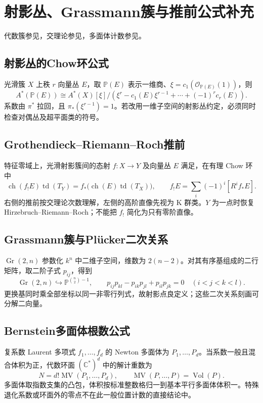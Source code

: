 \documentclass[../main.tex]{subfiles}
\begin{document}
\section{射影丛、Grassmann簇与推前公式补充}
代数簇参见\cite{milneAG}，交理论参见\cite{stacks}，多面体计数参见\cite{toric}。
\subsection{射影丛的Chow环公式}
光滑簇 $X$ 上秩 $r$ 向量丛 $E$，取 $\mathbb P(E)$ 表示一维商、$\xi=c_1(\mathcal O_{\mathbb P(E)}(1))$，则
\[
A^*(\mathbb P(E))\cong
A^*(X)[\xi]/\left(\xi^r-c_1(E)\xi^{r-1}+\cdots+(-1)^rc_r(E)\right).
\]
系数由 $\pi^*$ 拉回，且 $\pi_*(\xi^{r-1})=1$。若改用一维子空间的射影丛约定，必须同时检查对偶丛及超平面类的符号。
\subsection{Grothendieck--Riemann--Roch推前}
特征零域上，光滑射影簇间的态射 $f:X\to Y$ 及向量丛 $E$ 满足，在有理 Chow 环中
\[
\operatorname{ch}(f_!E)\operatorname{td}(T_Y)
=f_*\bigl(\operatorname{ch}(E)\operatorname{td}(T_X)\bigr),\qquad
f_!E=\sum_i(-1)^i[R^if_*E].
\]
右侧的推前按交理论次数理解，左侧的高阶直像先视为 K 群类。$Y$ 为一点时恢复 Hirzebruch--Riemann--Roch；不能把 $f_!$ 简化为只有零阶直像。
\subsection{Grassmann簇与Plücker二次关系}
$\operatorname{Gr}(2,n)$ 参数化 $k^n$ 中二维子空间，维数为 $2(n-2)$。对其有序基组成的二行矩阵，取二阶子式 $p_{ij}$，得到
\[
\operatorname{Gr}(2,n)\hookrightarrow\mathbb P^{\binom n2-1},\qquad
p_{ij}p_{kl}-p_{ik}p_{jl}+p_{il}p_{jk}=0\quad(i<j<k<l).
\]
更换基同时乘全部坐标以同一非零行列式，故射影点良定义；这些二次关系刻画可分解二向量。
\subsection{Bernstein多面体根数公式}
复系数 Laurent 多项式 $f_1,\ldots,f_d$ 的 Newton 多面体为 $P_1,\ldots,P_d$。当系数一般且混合体积为正，代数环面 $(\mathbb C^*)^d$ 中的解计重数为
\[
N=d!\operatorname{MV}(P_1,\ldots,P_d),\qquad
\operatorname{MV}(P,\ldots,P)=\operatorname{Vol}(P).
\]
多面体取指数支集的凸包，体积按标准整数格归一到基本平行多面体体积一。特殊退化系数或环面外的零点不在此一般位置计数的直接结论中。
\clearpage
\end{document}
